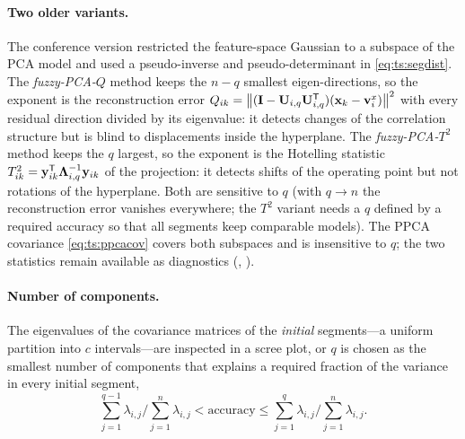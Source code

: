 \paragraph{Two older variants.} The conference version \cite{abonyi:2003:segmentation} restricted the feature-space Gaussian to a subspace of the PCA model and used a pseudo-inverse and pseudo-determinant in \eqref{eq:ts:segdist}. The \emph{fuzzy-PCA-$Q$} method keeps the $n-q$ smallest eigen-directions, so the exponent is the reconstruction error $Q_{ik}=\left\lVert (\mathbf{I}-\mathbf{U}_{i,q}\mathbf{U}_{i,q}^{\mathsf{T}})(\mathbf{x}_k-\mathbf{v}^x_i) \right\rVert^2$ with every residual direction divided by its eigenvalue: it detects changes of the correlation structure but is blind to displacements inside the hyperplane. The \emph{fuzzy-PCA-$T^2$} method keeps the $q$ largest, so the exponent is the Hotelling statistic $T^2_{ik}=\mathbf{y}_{ik}^{\mathsf{T}}\boldsymbol\Lambda_{i,q}^{-1}\mathbf{y}_{ik}$ of the projection: it detects shifts of the operating point but not rotations of the hyperplane. Both are sensitive to $q$ (with $q\to n$ the reconstruction error vanishes everywhere; the $T^2$ variant needs a $q$ defined by a required accuracy so that all segments keep comparable models). The PPCA covariance \eqref{eq:ts:ppcacov} covers both subspaces and is insensitive to $q$; the two statistics remain available as diagnostics (, ).

\paragraph{Number of components.} The eigenvalues of the covariance matrices of the \emph{initial} segments---a uniform partition into $c$ intervals---are inspected in a scree plot, or $q$ is chosen as the smallest number of components that explains a required fraction of the variance in every initial segment,
\begin{equation}
  \sum_{j=1}^{q-1}\lambda_{i,j}\Big/\sum_{j=1}^{n}\lambda_{i,j}<\text{accuracy}\le\sum_{j=1}^{q}\lambda_{i,j}\Big/\sum_{j=1}^{n}\lambda_{i,j}.
  \label{eq:ts:accuracy}
\end{equation}

